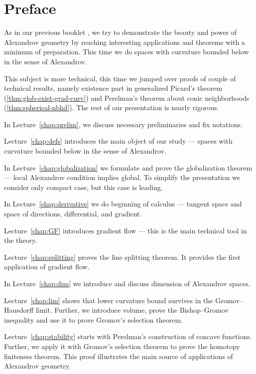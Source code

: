 \chapter*{Preface}

As in our previous booklet \cite{alexander-kapovitch-petrunin-2019},
we try to demonstrate the beauty and power of Alexandrov geometry by reaching interesting applications and theorems with a minimum of preparation.
This time we do spaces with curvature bounded below in the sense of Alexandrov.

This subject is more technical, this time we jumped over proofs of couple of technical results,
namely existence part in generalized Picard's theorem (\ref{thm:glob-exist-grad-curv})
and Perelman's theorem about conic neighborhoods (\ref{thm:spherical-nbhd}).
The rest of our presentation is nearly rigorous.

\medskip 

In Lecture~\ref{chap:prelim}, we discuss necessary preliminaries and fix notations.

Lecture~\ref{chap:defs} introduces the main object of our study --- spaces with curvature bounded below in the sense of Alexandrov.

In Lecture~\ref{chap:globalization} we formulate and prove the globalization theorem --- local Alexandrov condition implies global.
To simplify the presentation we consider only compact case, but this case is leading.

In Lecture~\ref{chap:derivative} we do beginning of calculus --- tangent space and space of directions, differential, and gradient.

Lecture~\ref{chap:GF} introduces gradient flow --- this is the main technical tool in the theory.

Lecture~\ref{chap:splitting} proves the line splitting theorem.
It provides the first application of gradient flow.

In Lecture~\ref{chap:dim} we introduce and discuss dimension of Alexandrov spaces.

Lecture~\ref{chap:lim} shows that lower curvature bound survives in the Gromov--Hausdorff limit.
Further, we introduce volume, prove the Bishop--Gromov inequality and use it to prove Gromov's selection theorem.

Lecture~\ref{chap:stability} starts with Perelman's construction of concave functions.
Further, we apply it with Gromov's selection theorem to prove the homotopy finiteness theorem.
This proof illustrates the main source of applications of Alexandrov geometry.

